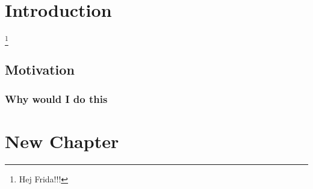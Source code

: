 \chapter{Introduction}
\lipsum[1-2]\footnote{Hej Frida!!!}
\section{Motivation}
\lipsum[3]
\subsection{Why would I do this}
\lipsum[4]

\chapter{New Chapter}
\lipsum[5-10]